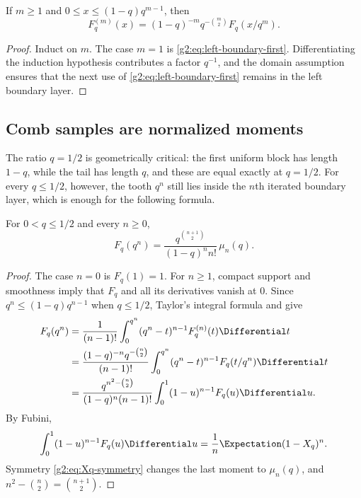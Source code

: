 \begin{lemma}
\label{g2:lem:boundary-tower}
If $m\ge1$ and $0\le x\le(1-q)q^{m-1}$, then
\begin{equation}
 F_q^{(m)}(x)
 =(1-q)^{-m}q^{-\binom m2}F_q(x/q^m).
 \label{g2:eq:boundary-derivative-tower}
\end{equation}
\end{lemma}

\begin{proof}
Induct on $m$.  The case $m=1$ is
\eqref{g2:eq:left-boundary-first}.  Differentiating the induction hypothesis
contributes a factor $q^{-1}$, and the domain assumption ensures that the next
use of \eqref{g2:eq:left-boundary-first} remains in the left boundary layer.
\end{proof}

\subsection{Comb samples are normalized moments}

The ratio $q=1/2$ is geometrically critical: the first uniform block has
length $1-q$, while the tail has length $q$, and these are equal exactly at
$q=1/2$.  For every $q\le1/2$, however, the tooth $q^n$ still lies inside the
$n$th iterated boundary layer, which is enough for the following formula.

\begin{theorem}
\label{g2:thm:comb-moment}
For $0<q\le1/2$ and every $n\ge0$,
\begin{equation}
 F_q(q^n)
 =\frac{q^{\binom{n+1}{2}}}{(1-q)^n n!}\,\mu_n(q).
 \label{g2:eq:comb-moment}
\end{equation}
\end{theorem}

\begin{proof}
The case $n=0$ is $F_q(1)=1$.  For $n\ge1$, compact support and smoothness
imply that $F_q$ and all its derivatives vanish at $0$.  Since
$q^n\le(1-q)q^{n-1}$ when $q\le1/2$, Taylor's integral formula and
 give
\begin{align*}
 F_q(q^n)
 &=\frac1{(n-1)!}\int_0^{q^n}(q^n-t)^{n-1}F_q^{(n)}(t)\Differential t\\
 &=\frac{(1-q)^{-n}q^{-\binom n2}}{(n-1)!}
   \int_0^{q^n}(q^n-t)^{n-1}F_q(t/q^n)\Differential t\\
 &=\frac{q^{n^2-\binom n2}}{(1-q)^n(n-1)!}
   \int_0^1(1-u)^{n-1}F_q(u)\Differential u.
\end{align*}
By Fubini,
\[
 \int_0^1(1-u)^{n-1}F_q(u)\Differential u
 =\frac1n\Expectation(1-X_q)^n.
\]
Symmetry \eqref{g2:eq:Xq-symmetry} changes the last moment to $\mu_n(q)$, and
$n^2-\binom n2=\binom{n+1}{2}$.
\end{proof}


